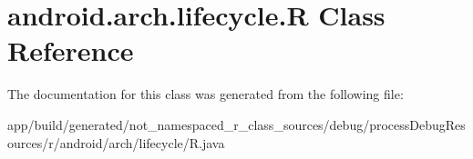 \hypertarget{classandroid_1_1arch_1_1lifecycle_1_1_r}{}\section{android.\+arch.\+lifecycle.\+R Class Reference}
\label{classandroid_1_1arch_1_1lifecycle_1_1_r}


The documentation for this class was generated from the following file\+:\begin{DoxyCompactItemize}
\item 
app/build/generated/not\+\_\+namespaced\+\_\+r\+\_\+class\+\_\+sources/debug/process\+Debug\+Resources/r/android/arch/lifecycle/R.\+java\end{DoxyCompactItemize}
